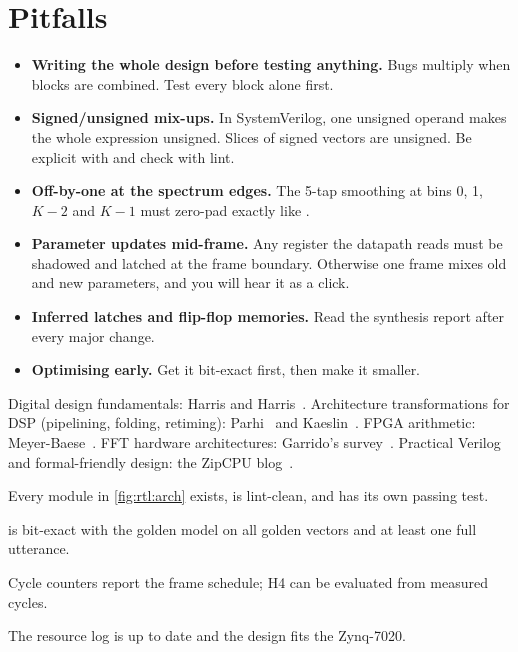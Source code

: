 \section{Pitfalls}\label{sec:rtl:pitfalls}

\begin{pitfallbox}
\begin{itemize}
  \item \textbf{Writing the whole design before testing anything.} Bugs
        multiply when blocks are combined. Test every block alone first.
  \item \textbf{Signed/unsigned mix-ups.} In SystemVerilog, one unsigned operand
        makes the whole expression unsigned. Slices of signed vectors are
        unsigned. Be explicit with  and check with lint.
  \item \textbf{Off-by-one at the spectrum edges.} The 5-tap smoothing at bins 0,
        1, $K-2$ and $K-1$ must zero-pad exactly like .
  \item \textbf{Parameter updates mid-frame.} Any register the datapath reads
        must be shadowed and latched at the frame boundary. Otherwise one frame
        mixes old and new parameters, and you will hear it as a click.
  \item \textbf{Inferred latches and flip-flop memories.} Read the synthesis
        report after every major change.
  \item \textbf{Optimising early.} Get it bit-exact first, then make it smaller.
\end{itemize}
\end{pitfallbox}

\begin{readbox}
Digital design fundamentals: Harris and Harris~\cite{harris2021ddca}.
Architecture transformations for DSP (pipelining, folding, retiming):
Parhi~\cite{parhi1999vlsidsp} and Kaeslin~\cite{ch12-13:kaeslin2014topdown}.
FPGA arithmetic: Meyer-Baese~\cite{meyerbaese2014fpgadsp}. FFT hardware
architectures: Garrido's survey~\cite{ch12-13:garrido2022fft}. Practical
Verilog and formal-friendly design: the ZipCPU blog~\cite{ch12-13:zipcpu}.
\end{readbox}

\begin{donebox}
\begin{checklist}
  \item Every module in \cref{fig:rtl:arch} exists, is lint-clean, and has its own passing test.
  \item {} is bit-exact with the golden model on all golden vectors and at least one full utterance.
  \item Cycle counters report the frame schedule; H4 can be evaluated from measured cycles.
  \item The resource log is up to date and the design fits the Zynq-7020.
\end{checklist}
\end{donebox}
